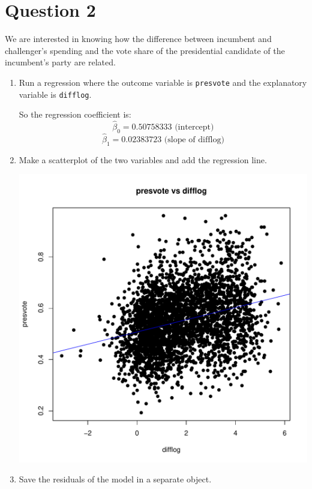 \documentclass[12pt,letterpaper]{article}
\begin{document}
\section*{Question 2}
\noindent We are interested in knowing how the difference between incumbent and challenger's spending and the vote share of the presidential candidate of the incumbent's party are related.	\vspace{.25cm}
	\begin{enumerate}
		\item Run a regression where the outcome variable is \texttt{presvote} and the explanatory variable is \texttt{difflog}.	
		
		\vspace{.5cm}
		 
			So the regression coefficient is:\\
		$$
		\hat{\beta}_0 = 0.50758333 \text{ (intercept)}
		$$
		$$
		\hat{\beta}_1 = 0.02383723 \text{ (slope of difflog)}
		$$
		\vspace{.5cm}
		
		\item Make a scatterplot of the two variables and add the regression line. 	
		
		\vspace{.5cm}
		 
		  \begin{center}
			\includegraphics[width=0.7\linewidth]{"scatter_plot2"}
		\end{center}
		
		\item Save the residuals of the model in a separate object.	
		

\end{enumerate}
\end{document}
